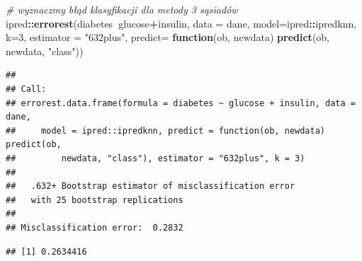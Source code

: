 \documentclass[polish,]{book}
\newenvironment{Shaded}{\begin{snugshade}}{\end{snugshade}}
\newcommand{\CommentTok}[1]{\textcolor[rgb]{0.56,0.35,0.01}{\textit{#1}}}
\newcommand{\ControlFlowTok}[1]{\textcolor[rgb]{0.13,0.29,0.53}{\textbf{#1}}}
\newcommand{\DataTypeTok}[1]{\textcolor[rgb]{0.13,0.29,0.53}{#1}}
\newcommand{\DecValTok}[1]{\textcolor[rgb]{0.00,0.00,0.81}{#1}}
\newcommand{\KeywordTok}[1]{\textcolor[rgb]{0.13,0.29,0.53}{\textbf{#1}}}
\newcommand{\NormalTok}[1]{#1}
\newcommand{\OperatorTok}[1]{\textcolor[rgb]{0.81,0.36,0.00}{\textbf{#1}}}
\newcommand{\StringTok}[1]{\textcolor[rgb]{0.31,0.60,0.02}{#1}}
\begin{document}
\begin{Shaded}
\begin{Highlighting}[]
\CommentTok{# wyznaczmy błąd klasyfikacji dla metody 3 sąsiadów}
\NormalTok{ipred}\OperatorTok{::}\KeywordTok{errorest}\NormalTok{(diabetes}\OperatorTok{~}\NormalTok{glucose}\OperatorTok{+}\NormalTok{insulin, }\DataTypeTok{data =}\NormalTok{ dane, }\DataTypeTok{model=}\NormalTok{ipred}\OperatorTok{::}\NormalTok{ipredknn, }\DataTypeTok{k=}\DecValTok{3}\NormalTok{,}
                \DataTypeTok{estimator =} \StringTok{"632plus"}\NormalTok{,}
                \DataTypeTok{predict=} \ControlFlowTok{function}\NormalTok{(ob, newdata) }\KeywordTok{predict}\NormalTok{(ob, newdata, }\StringTok{"class"}\NormalTok{))}
\end{Highlighting}
\end{Shaded}

\begin{verbatim}
## 
## Call:
## errorest.data.frame(formula = diabetes ~ glucose + insulin, data = dane, 
##     model = ipred::ipredknn, predict = function(ob, newdata) predict(ob, 
##         newdata, "class"), estimator = "632plus", k = 3)
## 
##   .632+ Bootstrap estimator of misclassification error 
##   with 25 bootstrap replications
## 
## Misclassification error:  0.2832
\end{verbatim}

\begin{Shaded}
\end{Shaded}

\begin{verbatim}
## [1] 0.2634416
\end{verbatim}
\end{document}
